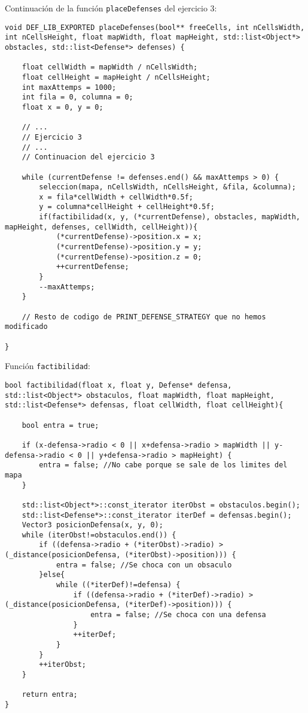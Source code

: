 Continuación de la función \texttt{placeDefenses} del ejercicio 3:
%
\begin{lstlisting}
void DEF_LIB_EXPORTED placeDefenses(bool** freeCells, int nCellsWidth, int nCellsHeight, float mapWidth, float mapHeight, std::list<Object*> obstacles, std::list<Defense*> defenses) {

    float cellWidth = mapWidth / nCellsWidth;
    float cellHeight = mapHeight / nCellsHeight;
    int maxAttemps = 1000;
    int fila = 0, columna = 0;
    float x = 0, y = 0;

    // ...
    // Ejercicio 3
    // ...
    // Continuacion del ejercicio 3

    while (currentDefense != defenses.end() && maxAttemps > 0) {
        seleccion(mapa, nCellsWidth, nCellsHeight, &fila, &columna);
        x = fila*cellWidth + cellWidth*0.5f;
        y = columna*cellHeight + cellHeight*0.5f;
        if(factibilidad(x, y, (*currentDefense), obstacles, mapWidth, mapHeight, defenses, cellWidth, cellHeight)){
            (*currentDefense)->position.x = x;
            (*currentDefense)->position.y = y;
            (*currentDefense)->position.z = 0;
            ++currentDefense;
        }
        --maxAttemps;
    }

    // Resto de codigo de PRINT_DEFENSE_STRATEGY que no hemos modificado

}

\end{lstlisting}
Función \texttt{factibilidad}:
%
\begin{lstlisting}
bool factibilidad(float x, float y, Defense* defensa, std::list<Object*> obstaculos, float mapWidth, float mapHeight, std::list<Defense*> defensas, float cellWidth, float cellHeight){

    bool entra = true;

    if (x-defensa->radio < 0 || x+defensa->radio > mapWidth || y-defensa->radio < 0 || y+defensa->radio > mapHeight) {
        entra = false; //No cabe porque se sale de los limites del mapa
    }

    std::list<Object*>::const_iterator iterObst = obstaculos.begin();
    std::list<Defense*>::const_iterator iterDef = defensas.begin();
    Vector3 posicionDefensa(x, y, 0);
    while (iterObst!=obstaculos.end()) {
        if ((defensa->radio + (*iterObst)->radio) > (_distance(posicionDefensa, (*iterObst)->position))) {
            entra = false; //Se choca con un obsaculo
        }else{
            while ((*iterDef)!=defensa) {
                if ((defensa->radio + (*iterDef)->radio) > (_distance(posicionDefensa, (*iterDef)->position))) {
                    entra = false; //Se choca con una defensa
                }
                ++iterDef;
            }
        }
        ++iterObst;
    }

    return entra;
}

\end{lstlisting}

